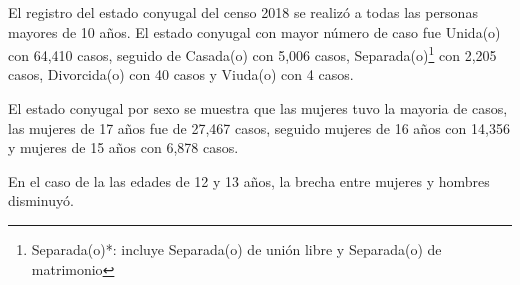 El registro del estado conyugal del censo 2018 se realizó a todas las personas mayores de 10 años. El estado conyugal con mayor número de caso fue Unida(o) con 64,410 casos, seguido de Casada(o) con 5,006 casos, Separada(o)\footnote{Separada(o)*: incluye Separada(o) de unión libre y Separada(o) de matrimonio} con 2,205 casos, Divorcida(o) con 40 casos y Viuda(o) con 4 casos.

El estado conyugal por sexo se muestra que las mujeres tuvo la mayoria de casos, las mujeres de 17 años fue de 27,467 casos, seguido mujeres de 16 años con 14,356 y mujeres de 15 años con 6,878 casos. 

En el caso de la las edades de 12 y 13 años, la brecha entre mujeres y hombres disminuyó.  